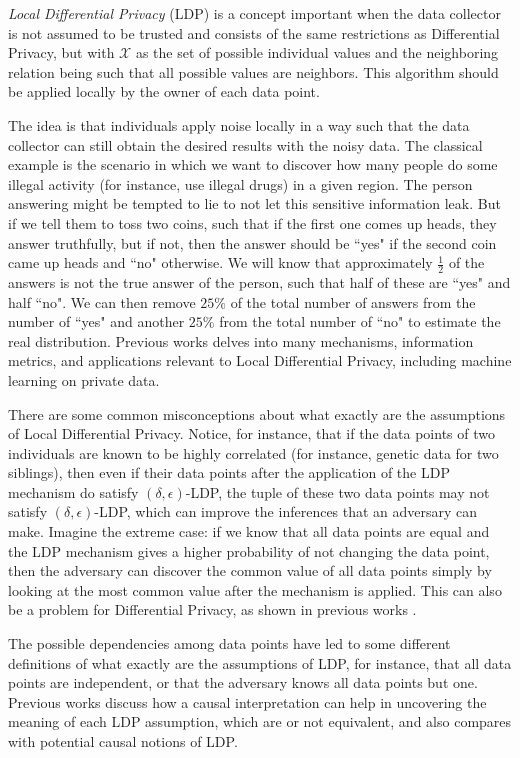 \documentclass[conference]{IEEEtran}
\newcommand{\qm}[1]{``#1"}
\begin{document}
\emph{Local Differential Privacy} (LDP) is a concept important when the data collector is not assumed to be trusted and consists of the same restrictions as Differential Privacy, but with $\mathcal{X}$ as the set of possible individual values and the neighboring relation being such that all possible values are neighbors. This algorithm should be applied locally by the owner of each data point.

The idea is that individuals apply noise locally in a way such that the data collector can still obtain the desired results with the noisy data. The classical example is the scenario in which we want to discover how many people do some illegal activity (for instance, use illegal drugs) in a given region. The person answering might be tempted to lie to not let this sensitive information leak. But if we tell them to toss two coins, such that if the first one comes up heads, they answer truthfully, but if not, then the answer should be \qm{yes} if the second coin came up heads and \qm{no} otherwise. We will know that approximately $\frac{1}{2}$ of the answers is not the true answer of the person, such that half of these are \qm{yes} and half \qm{no}. We can then remove $25\%$ of the total number of answers from the number of \qm{yes} and another $25\%$ from the total number of \qm{no} to estimate the real distribution. Previous works \cite{xiong2020comprehensive} delves into many mechanisms, information metrics, and applications relevant to Local Differential Privacy, including machine learning on private data.

There are some common misconceptions about what exactly are the assumptions of Local Differential Privacy. Notice, for instance, that if the data points of two individuals are known to be highly correlated (for instance, genetic data for two siblings), then even if their data points after the application of the LDP mechanism do satisfy $(\delta,\epsilon)$-LDP, the tuple of these two data points may not satisfy $(\delta,\epsilon)$-LDP, which can improve the inferences that an adversary can make. Imagine the extreme case: if we know that all data points are equal and the LDP mechanism gives a higher probability of not changing the data point, then the adversary can discover the common value of all data points simply by looking at the most common value after the mechanism is applied. This can also be a problem for Differential Privacy, as shown in previous works \cite{liu2016dependence}. 

The possible dependencies among data points have led to some different definitions of what exactly are the assumptions of LDP, for instance, that all data points are independent, or that the adversary knows all data points but one. Previous works \cite{tschantz2020sok} discuss how a causal interpretation can help in uncovering the meaning of each LDP assumption, which are or not equivalent, and also compares with potential causal notions of LDP.
\end{document}
